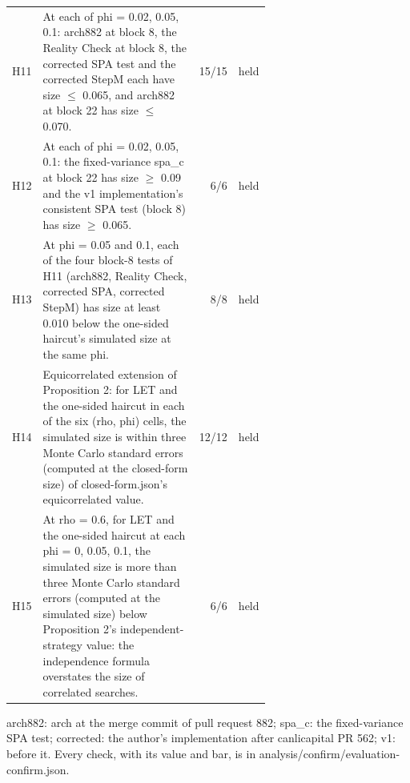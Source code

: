 \begin{table}[t]
\begin{tabular}{lp{0.64\linewidth}rl}
H11 & At each of phi = 0.02, 0.05, 0.1: arch882 at block 8, the Reality Check at block 8, the corrected SPA test and the corrected StepM each have size $\le$ 0.065, and arch882 at block 22 has size $\le$ 0.070. & 15/15 & held \\
H12 & At each of phi = 0.02, 0.05, 0.1: the fixed-variance spa\_c at block 22 has size $\ge$ 0.09 and the v1 implementation's consistent SPA test (block 8) has size $\ge$ 0.065. & 6/6 & held \\
H13 & At phi = 0.05 and 0.1, each of the four block-8 tests of H11 (arch882, Reality Check, corrected SPA, corrected StepM) has size at least 0.010 below the one-sided haircut's simulated size at the same phi. & 8/8 & held \\
H14 & Equicorrelated extension of Proposition 2: for LET and the one-sided haircut in each of the six (rho, phi) cells, the simulated size is within three Monte Carlo standard errors (computed at the closed-form size) of closed-form.json's equicorrelated value. & 12/12 & held \\
H15 & At rho = 0.6, for LET and the one-sided haircut at each phi = 0, 0.05, 0.1, the simulated size is more than three Monte Carlo standard errors (computed at the simulated size) below Proposition 2's independent-strategy value: the independence formula overstates the size of correlated searches. & 6/6 & held \\
\bottomrule
\end{tabular}
\par\smallskip\begin{minipage}{0.97\linewidth}\footnotesize arch882: arch at the merge commit of pull request 882; spa\_c: the fixed-variance SPA test; corrected: the author's implementation after canlicapital PR 562; v1: before it. Every check, with its value and bar, is in analysis/confirm/evaluation-confirm.json.\end{minipage}
\end{table}

